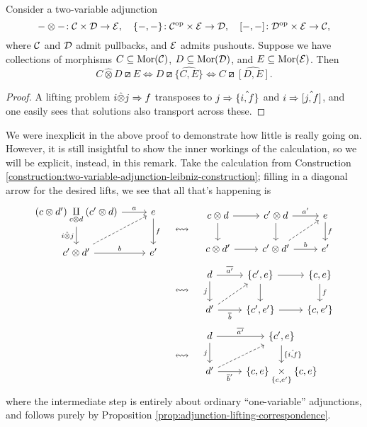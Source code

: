 \begin{proposition}\label{prop:two-variable-adjunction-lifting-correspondence}
	Consider a two-variable adjunction
	\[ -\otimes-\!: \mathcal{C}\times\mathcal{D}\to\mathcal{E},\quad \{-,-\}\!:\mathcal{C}^{\mathrm{op}}\times\mathcal{E}\to\mathcal{D},\quad [-,-]\!:\mathcal{D}^{\mathrm{op}}\times\mathcal{E}\to\mathcal{C}, \]
	where \(\mathcal{C}\) and \(\mathcal{D}\) admit pullbacks, and \(\mathcal{E}\) admits pushouts. Suppose we have collections of morphisms \(C\subseteq\operatorname{Mor}(\mathcal{C})\), \(D\subseteq\operatorname{Mor}(\mathcal{D})\), and
	\(E\subseteq\operatorname{Mor}(\mathcal{E})\). Then
	\[ C\hat\otimes D \boxslash E \iff D\boxslash \hat{\{C,E\}} \iff C \boxslash \hat{[D,E]}. \]
\end{proposition}
\begin{proof}
A lifting problem \(i\hat\otimes j \Rightarrow f\) transposes to \(j \Rightarrow \hat{\{i,f\}}\) and \(i \Rightarrow \hat{ [j,f] }\), and one easily sees that solutions also
transport across these.
\end{proof}
\begin{remark}
	We were inexplicit in the above proof to demonstrate how little is really going on. However, it is still insightful to show the inner workings of the calculation,
	so we will be explicit, instead, in this remark. Take the calculation from Construction \ref{construction:two-variable-adjunction-leibniz-construction};
	filling in a diagonal arrow for the desired lifts, we see that all that's happening is
	\begin{align*}
		\begin{tikzcd}[ampersand replacement=\&]
			(c\otimes d') \underset{c\otimes d}\amalg(c'\otimes d) \ar[d,"i\hat\otimes j"']\ar[r,"a"] \& e\ar[d,"f"] \\
			c'\otimes d'\ar[r,"b"]\ar[ur,dashed] \& e'
		\end{tikzcd} \quad &\leftrightsquigarrow \quad
		\begin{tikzcd}[ampersand replacement=\&]
			c\otimes d\ar[r]\ar[d] \& c'\otimes d \ar[d]\ar[r,"a'"] \& e\ar[d,"f"] \\
			c\otimes d'\ar[r] \& c'\otimes d'\ar[r,"b"] \ar[ur,dashed] \& e'
		\end{tikzcd} \\
		&\leftrightsquigarrow \quad
		\begin{tikzcd}[ampersand replacement=\&]
			d\ar[r,"\overline{a'}"]\ar[d,"j"'] \& \{c',e\} \ar[d]\ar[r] \& \{c,e\} \ar[d,"f"] \\
			d'\ar[r,"\overline{b}"']\ar[ur,dashed] \& \{c',e'\}\ar[r] \& \{c,e'\}
		\end{tikzcd} \\
		&\leftrightsquigarrow \quad
		\begin{tikzcd}[ampersand replacement=\&]
			d\ar[r,"\overline{a'}"]\ar[d,"j"'] \& \{c',e\} \ar[d,"\hat{ \{i,f\} }"] \\
			d'\ar[r,"\overline{b}'"']\ar[ur,dashed] \& \{c,e\}\underset{\{c,e'\}}\times \{c,e\}
		\end{tikzcd}
	\end{align*}
	where the intermediate step is entirely about ordinary ``one-variable'' adjunctions, and follows purely by Proposition \ref{prop:adjunction-lifting-correspondence}.
\end{remark}

